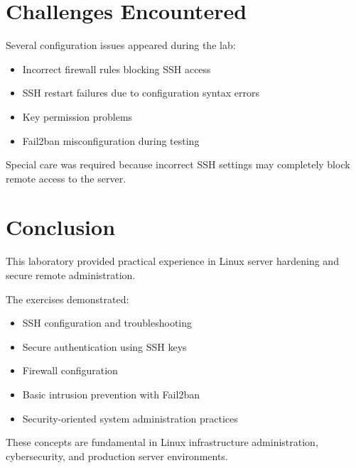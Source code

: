 \documentclass[11pt,a4paper]{article}
\begin{document}
\section{Challenges Encountered}

Several configuration issues appeared during the lab:
\begin{itemize}
    \item Incorrect firewall rules blocking SSH access
    \item SSH restart failures due to configuration syntax errors
    \item Key permission problems
    \item Fail2ban misconfiguration during testing
\end{itemize}

Special care was required because incorrect SSH settings may completely block remote access to the server.

\section{Conclusion}

This laboratory provided practical experience in Linux server hardening and secure remote administration.

The exercises demonstrated:
\begin{itemize}
    \item SSH configuration and troubleshooting
    \item Secure authentication using SSH keys
    \item Firewall configuration
    \item Basic intrusion prevention with Fail2ban
    \item Security-oriented system administration practices
\end{itemize}

These concepts are fundamental in Linux infrastructure administration, cybersecurity, and production server environments.
\end{document}

